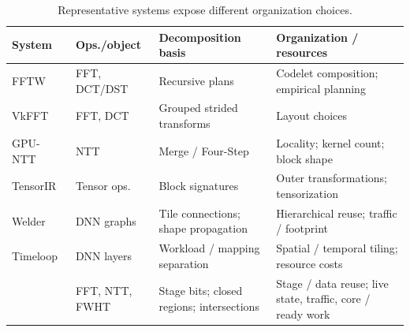 \begin{table}[t]
\centering
\caption{Representative systems expose different organization choices.}
\label{tab:related-work}
\footnotesize
\setlength{\tabcolsep}{2pt}
\renewcommand{\arraystretch}{1.08}
\begin{tabular}{@{}>{\raggedright\arraybackslash}p{}>{\raggedright\arraybackslash}p{}>{\raggedright\arraybackslash}p{}>{\raggedright\arraybackslash}p{}@{}}
\toprule
System & Ops./\allowbreak object & Decomposition basis & Organization / resources \\
\midrule
FFTW~\cite{fftw2005} & FFT, DCT/\allowbreak DST & Recursive plans & Codelet composition; empirical planning \\
\addlinespace[2pt]
VkFFT~\cite{vkfft2023,vkfft} & FFT, DCT & Grouped strided transforms & Layout choices \\
\addlinespace[2pt]
GPU-NTT~\cite{gpuntt2023,gpuntt2025} & NTT & Merge / Four-Step & Locality; kernel count; block shape \\
\midrule
TensorIR~\cite{tensorir2023} & Tensor ops. & Block signatures & Outer transformations; tensorization \\
\addlinespace[2pt]
Welder~\cite{welder2023} & DNN graphs & Tile connections; shape propagation & Hierarchical reuse; traffic / footprint \\
\addlinespace[2pt]
Timeloop~\cite{timeloop2019} & DNN layers & Workload / mapping separation & Spatial / temporal tiling; resource costs \\
\midrule
\system{} & FFT, NTT, FWHT & Stage bits; closed regions; intersections & Stage / data reuse; live state, traffic, core / ready work \\
\bottomrule
\end{tabular}
\end{table}
